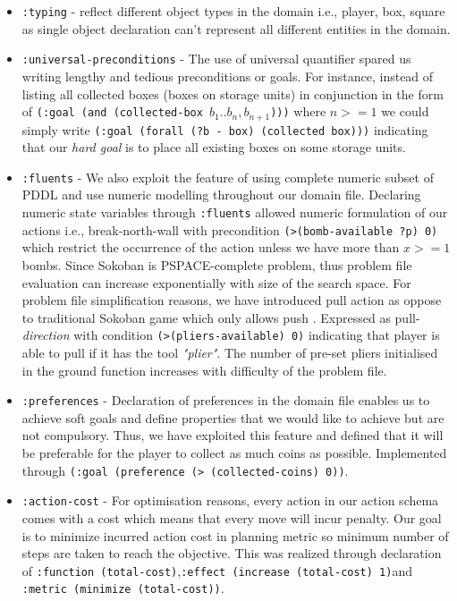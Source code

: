 \documentclass[letterpaper]{article} %
\begin{document}
\begin{itemize}
\item \texttt{:typing} - reflect different object types in the domain i.e., player, box, square as single object declaration can’t represent all different entities in the domain.
\item \texttt{:universal-preconditions} - The use of universal quantifier spared us writing lengthy and tedious preconditions or goals. For instance, instead of listing all collected boxes (boxes on storage units) in conjunction in the form of \texttt{(:goal (and (collected-box \(b_1 ..b_n, b_{n+1}\))))} where \(n >= 1\) we could simply write \texttt{(:goal (forall (?b - box) (collected box)))} indicating that our \emph{hard goal} is to place all existing boxes on some storage units.
\item \texttt{:fluents} - We also exploit the feature of using complete numeric subset of PDDL and use numeric modelling throughout our domain file. Declaring numeric state variables through \texttt{:fluents} allowed numeric formulation of our actions i.e., break-north-wall with precondition
\texttt{(>(bomb-available ?p) 0)} which restrict the occurrence of the action unless we have more than \(x >= 1\) bombs. Since Sokoban is PSPACE-complete problem, thus problem file evaluation can increase exponentially with size of the search space. For problem file simplification reasons, we have introduced pull action as oppose to traditional Sokoban game which only allows push . Expressed as pull-\emph{direction} with condition \texttt{(>(pliers-available) 0)} indicating that player is able to pull if it has the tool \emph{"plier"}. The number of pre-set pliers initialised in the ground function increases with difficulty of the problem file.
\item \texttt{:preferences} - Declaration of preferences in the domain file enables us to achieve soft goals and define properties that we would like to achieve but are not compulsory. Thus, we have exploited this feature and defined that it will be preferable for the player to collect as much coins as possible. Implemented through \texttt{(:goal (preference (> (collected-coins) 0))}.
\item \texttt{:action-cost} -  For optimisation reasons, every action in our action schema comes with  a cost which means that every move will incur penalty.  Our goal is to minimize incurred action cost in planning metric so minimum number of steps are taken to reach the objective.  This was realized through declaration of \texttt{:function (total-cost)},\texttt{:effect (increase (total-cost) 1)}and\texttt{ :metric (minimize (total-cost))}.
\end{itemize}
\end{document}
